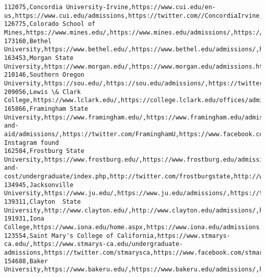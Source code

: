 \documentclass[11pt]{article}
\begin{document}
\begin{Verbatim}[commandchars=\\\{\}]
112075,Concordia University-Irvine,https://www.cui.edu/en-us,https://www.cui.edu/admissions,https://twitter.com//ConcordiaIrvine,https://www.facebook.com/concordiairvine,https://www.instagram.com/concordiairvine/
126775,Colorado School of Mines,https://www.mines.edu/,https://www.mines.edu/admissions/,https://twitter.com/coschoolofmines,https://www.facebook.com/ColoradoSchoolofMines,https://www.instagram.com/coloradoschoolofmines
173160,Bethel University,https://www.bethel.edu/,https://www.bethel.edu/admissions/,https://twitter.com/BethelU,https://www.facebook.com/betheluniversity,https://www.instagram.com/bethelumn
163453,Morgan State University,https://www.morgan.edu/,https://www.morgan.edu/admissions.html,https://twitter.com/MorganStateU,https://www.facebook.com/morganstateu,https://instagram.com/morganstateu/
210146,Southern Oregon University,https://sou.edu/,https://sou.edu/admissions/,https://twitter.com/@souashland/,https://www.facebook.com/SOUAshland/,https://www.instagram.com/souashland/
209056,Lewis \& Clark College,https://www.lclark.edu/,https://college.lclark.edu/offices/admissions/,http://twitter.com/lewisandclark,http://www.facebook.com/lewisandclarkcollege,http://instagram.com/lewisandclarkcollege
165866,Framingham State University,https://www.framingham.edu/,https://www.framingham.edu/admissions-and-aid/admissions/,https://twitter.com/FraminghamU,https://www.facebook.com/FraminghamStateUniversity,No Instagram found
162584,Frostburg State University,https://www.frostburg.edu/,https://www.frostburg.edu/admissions-and-cost/undergraduate/index.php,http://twitter.com/frostburgstate,http://www.facebook.com/FrostburgStateUniversity/,https://www.instagram.com/p/BpcXdn1Hd07/
134945,Jacksonville University,https://www.ju.edu/,https://www.ju.edu/admissions/,https://twitter.com/JacksonvilleU,https://www.facebook.com/jacksonvilleuniversity,https://www.instagram.com/jacksonvilleu/
139311,Clayton  State University,http://www.clayton.edu/,http://www.clayton.edu/admissions/,https://twitter.com/ClaytonState,https://www.facebook.com/ClaytonStateUniversity/,https://www.instagram.com/claytonstateuniv/
191931,Iona College,https://www.iona.edu/home.aspx,https://www.iona.edu/admissions.aspx,https://twitter.com/ionacollege,https://www.facebook.com/IonaCollegeNY,https://instagram.com/ionacollege/
123554,Saint Mary's College of California,https://www.stmarys-ca.edu/,https://www.stmarys-ca.edu/undergraduate-admissions,https://twitter.com/stmarysca,https://www.facebook.com/stmarysca,https://www.instagram.com/stmarysca/
154688,Baker University,https://www.bakeru.edu/,https://www.bakeru.edu/admissions/,http://twitter.com/BakerUniversity,http://www.facebook.com/BakerUniversity,http://instagram.com/bakeruniversity

\end{Verbatim}
\end{document}
